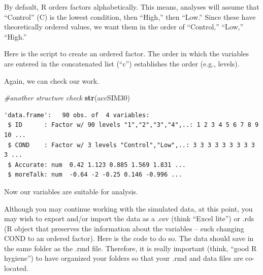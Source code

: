 \documentclass[
  11pt,
]{book}
\newenvironment{Shaded}{\begin{snugshade}}{\end{snugshade}}
\newcommand{\AttributeTok}[1]{\textcolor[rgb]{0.27,0.27,0.27}{#1}}
\newcommand{\CommentTok}[1]{\textcolor[rgb]{0.37,0.37,0.37}{\textit{#1}}}
\newcommand{\FunctionTok}[1]{\textcolor[rgb]{0.27,0.27,0.27}{\textbf{#1}}}
\newcommand{\NormalTok}[1]{#1}
\newcommand{\OtherTok}[1]{\textcolor[rgb]{0.37,0.37,0.37}{#1}}
\newcommand{\SpecialCharTok}[1]{\textcolor[rgb]{0.43,0.43,0.43}{\textbf{#1}}}
\newcommand{\StringTok}[1]{\textcolor[rgb]{0.5,0.5,0.5}{#1}}
\begin{document}
By default, R orders factors alphabetically. This means, analyses will assume that ``Control'' (C) is the lowest condition, then ``High,'' then ``Low.'' Since these have theoretically ordered values, we want them in the order of ``Control,'' ``Low,'' ``High.''

Here is the script to create an ordered factor. The order in which the variables are entered in the concatenated list (``c'') establishes the order (e.g., levels).

\begin{Shaded}
\end{Shaded}

Again, we can check our work.

\begin{Shaded}
\begin{Highlighting}[]
\CommentTok{\#another structure check}
\FunctionTok{str}\NormalTok{(accSIM30)}
\end{Highlighting}
\end{Shaded}

\begin{verbatim}
'data.frame':   90 obs. of  4 variables:
 $ ID      : Factor w/ 90 levels "1","2","3","4",..: 1 2 3 4 5 6 7 8 9 10 ...
 $ COND    : Factor w/ 3 levels "Control","Low",..: 3 3 3 3 3 3 3 3 3 3 ...
 $ Accurate: num  0.42 1.123 0.885 1.569 1.831 ...
 $ moreTalk: num  -0.64 -2 -0.25 0.146 -0.996 ...
\end{verbatim}

Now our variables are suitable for analysis.

Although you may continue working with the simulated data, at this point, you may wish to export and/or import the data as a .csv (think ``Excel lite'') or .rds (R object that preserves the information about the variables -- such changing COND to an ordered factor). Here is the code to do so. The data should save in the same folder as the .rmd file. Therefore, it is really important (think, ``good R hygiene'') to have organized your folders so that your .rmd and data files are co-located.
\end{document}
